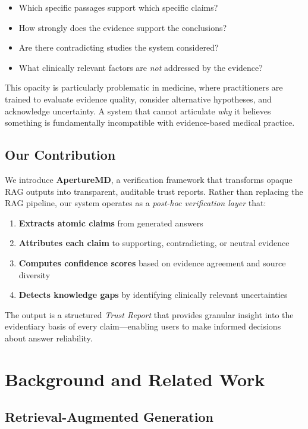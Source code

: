 \documentclass[11pt,a4paper]{article}
\begin{document}
\begin{itemize}
    \item Which specific passages support which specific claims?
    \item How strongly does the evidence support the conclusions?
    \item Are there contradicting studies the system considered?
    \item What clinically relevant factors are \textit{not} addressed by the evidence?
\end{itemize}

This opacity is particularly problematic in medicine, where practitioners are trained to evaluate evidence quality, consider alternative hypotheses, and acknowledge uncertainty. A system that cannot articulate \textit{why} it believes something is fundamentally incompatible with evidence-based medical practice.

\subsection{Our Contribution}

We introduce \textbf{ApertureMD}, a verification framework that transforms opaque RAG outputs into transparent, auditable trust reports. Rather than replacing the RAG pipeline, our system operates as a \textit{post-hoc verification layer} that:

\begin{enumerate}
    \item \textbf{Extracts atomic claims} from generated answers
    \item \textbf{Attributes each claim} to supporting, contradicting, or neutral evidence
    \item \textbf{Computes confidence scores} based on evidence agreement and source diversity
    \item \textbf{Detects knowledge gaps} by identifying clinically relevant uncertainties
\end{enumerate}

The output is a structured \textit{Trust Report} that provides granular insight into the evidentiary basis of every claim—enabling users to make informed decisions about answer reliability.

\section{Background and Related Work}

\subsection{Retrieval-Augmented Generation}
\end{document}
